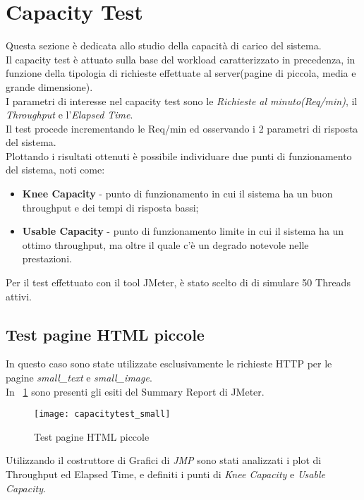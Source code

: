 \section{Capacity Test}
Questa sezione è dedicata allo studio della capacità di carico del sistema.\\
Il capacity test è attuato sulla base del workload caratterizzato in precedenza,
in funzione della tipologia di richieste effettuate al server(pagine di
piccola, media e grande dimensione).\\
I parametri di interesse nel capacity test sono le \textit{Richieste al minuto(Req/min)},
il \textit{Throughput} e l'\textit{Elapsed Time}.\\
Il test procede incrementando le Req/min ed osservando i 2 parametri di risposta
del sistema.\\
Plottando i risultati ottenuti è possibile individuare due punti di funzionamento
del sistema, noti come:
\begin{itemize}
  \item \textbf{Knee Capacity} - punto di funzionamento in cui il sistema ha un
  buon throughput e dei tempi di risposta bassi;
  \item \textbf{Usable Capacity} - punto di funzionamento limite in cui il sistema
  ha un ottimo throughput, ma oltre il quale c'è un degrado notevole nelle prestazioni.
\end{itemize}

Per il test effettuato con il tool JMeter, è stato scelto di di simulare 50 Threads
attivi.\\

\subsection{Test pagine HTML piccole}
In questo caso sono state utilizzate esclusivamente le richieste HTTP per le pagine
\textit{small\_text} e \textit{small\_image}.\\
In \figurename~\ref{webserver_small_page_summary_report} sono presenti gli esiti del
Summary Report di JMeter.\\

\begin{figure}[!htbp]
  \centering
  \texttt{[image: capacitytest\_small]}
  \caption{Test pagine HTML piccole}
  \label{webserver_small_page_summary_report}
\end{figure}

Utilizzando il costruttore di Grafici di \textit{JMP} sono stati analizzati i plot
di Throughput ed Elapsed Time, e definiti i punti di \textit{Knee Capacity} e
\textit{Usable Capacity}.\\

